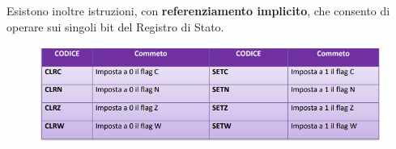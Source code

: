 \documentclass[12pt]{article}
\begin{document}
\newpage \noindent Esistono inoltre istruzioni, con \textbf{referenziamento implicito}, che consento di operare sui singoli bit del Registro di Stato.
\begin{figure}[h]
    \centering
    \includegraphics[width=1\linewidth]{Operare sui registri di stato.png}
\end{figure}
\par\maketitle\noindent 
\end{document}
